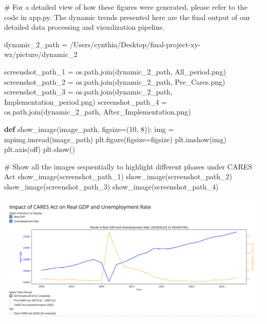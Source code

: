 \documentclass[
  letterpaper,
  DIV=11,
  numbers=noendperiod]{scrartcl}
\newenvironment{Shaded}{\begin{snugshade}}{\end{snugshade}}
\newcommand{\CommentTok}[1]{\textcolor[rgb]{0.37,0.37,0.37}{#1}}
\newcommand{\DecValTok}[1]{\textcolor[rgb]{0.68,0.00,0.00}{#1}}
\newcommand{\KeywordTok}[1]{\textcolor[rgb]{0.00,0.23,0.31}{\textbf{#1}}}
\newcommand{\NormalTok}[1]{\textcolor[rgb]{0.00,0.23,0.31}{#1}}
\newcommand{\OperatorTok}[1]{\textcolor[rgb]{0.37,0.37,0.37}{#1}}
\newcommand{\StringTok}[1]{\textcolor[rgb]{0.13,0.47,0.30}{#1}}
\begin{document}
\begin{Shaded}
\begin{Highlighting}[]
\CommentTok{\# For a detailed view of how these figures were generated, please refer to the code in app.py. The dynamic trends presented here are the final output of our detailed data processing and visualization pipeline. }

\NormalTok{dynamic\_2\_path }\OperatorTok{=} \StringTok{\textquotesingle{}/Users/cynthia/Desktop/final{-}project{-}xy{-}wz/picture/dynamic\_2\textquotesingle{}}

\NormalTok{screenshot\_path\_1 }\OperatorTok{=}\NormalTok{ os.path.join(dynamic\_2\_path, }\StringTok{\textquotesingle{}All\_period.png\textquotesingle{}}\NormalTok{)}
\NormalTok{screenshot\_path\_2 }\OperatorTok{=}\NormalTok{ os.path.join(dynamic\_2\_path, }\StringTok{\textquotesingle{}Pre\_Cares.png\textquotesingle{}}\NormalTok{)}
\NormalTok{screenshot\_path\_3 }\OperatorTok{=}\NormalTok{ os.path.join(dynamic\_2\_path, }\StringTok{\textquotesingle{}Implementation\_period.png\textquotesingle{}}\NormalTok{)}
\NormalTok{screenshot\_path\_4 }\OperatorTok{=}\NormalTok{ os.path.join(dynamic\_2\_path, }\StringTok{\textquotesingle{}After\_Implementation.png\textquotesingle{}}\NormalTok{) }


\KeywordTok{def}\NormalTok{ show\_image(image\_path, figsize}\OperatorTok{=}\NormalTok{(}\DecValTok{10}\NormalTok{, }\DecValTok{8}\NormalTok{)):}
\NormalTok{    img }\OperatorTok{=}\NormalTok{ mpimg.imread(image\_path)}
\NormalTok{    plt.figure(figsize}\OperatorTok{=}\NormalTok{figsize)}
\NormalTok{    plt.imshow(img)}
\NormalTok{    plt.axis(}\StringTok{\textquotesingle{}off\textquotesingle{}}\NormalTok{)}
\NormalTok{    plt.show()}

\CommentTok{\# Show all the images sequentially to highlight different phases under CARES Act}
\NormalTok{show\_image(screenshot\_path\_1)}
\NormalTok{show\_image(screenshot\_path\_2)}
\NormalTok{show\_image(screenshot\_path\_3)}
\NormalTok{show\_image(screenshot\_path\_4)}
\end{Highlighting}
\end{Shaded}

\includegraphics{finalproject_template_files/figure-pdf/cell-15-output-1.pdf}
\end{document}
